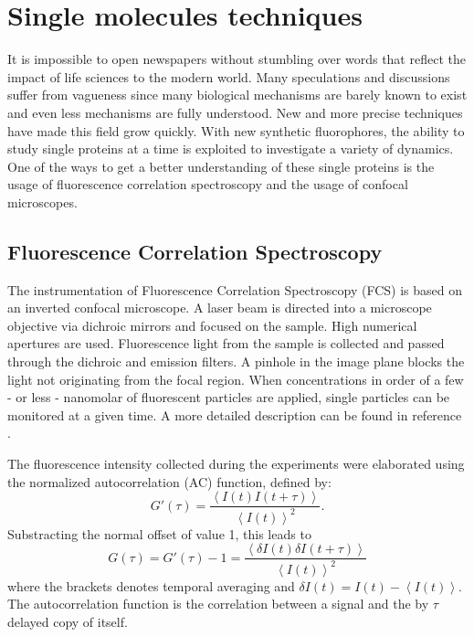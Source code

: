 \documentclass[twoside,single]{lion-msc}
\begin{document}
\section{Single molecules techniques}
It is impossible to open newspapers without stumbling over words that reflect the impact of life sciences to the modern world. Many speculations and discussions suffer from vagueness since many biological mechanisms are barely known to exist and even less mechanisms are fully understood. New and more precise techniques have made this field grow quickly. With new synthetic fluorophores, the ability to study single proteins at a time is exploited to investigate a variety of dynamics.  One of the ways to get a better understanding of these single proteins is the usage of fluorescence correlation spectroscopy and the usage of confocal microscopes. 

\subsection{Fluorescence Correlation Spectroscopy}
The instrumentation of Fluorescence Correlation Spectroscopy (FCS) is based on an inverted confocal microscope.  A laser beam is directed into a microscope objective via dichroic mirrors and focused on the sample. High numerical apertures are used. Fluorescence light from the sample is collected and passed through the dichroic and emission filters. A pinhole in the image plane blocks the light not originating from the focal region. When concentrations in order of a few - or less - nanomolar of fluorescent particles are applied, single particles can be monitored at a given time. A more detailed description can be found in reference \cite{Schwille}.

The fluorescence intensity collected during the experiments were elaborated using the normalized autocorrelation (AC) function, defined by:
\begin{equation}
G'(\tau) = \frac{\left \langle I(t)I(t + \tau) \right \rangle}{\left \langle I(t)\right \rangle ^{2}}.
\end{equation}
Substracting the normal offset of value 1, this leads to
\begin{equation} \label{AC}
G(\tau) = G'(\tau) - 1 =  \frac{\left \langle \delta I(t)\delta I(t + \tau) \right \rangle}{\left \langle I(t)\right \rangle ^{2}}
\end{equation}
where the brackets  denotes temporal averaging and $\delta I(t) = I(t) - \left \langle I(t)\right \rangle$. The autocorrelation function is the correlation between a signal and the by $\tau$ delayed copy of itself.
\end{document}

